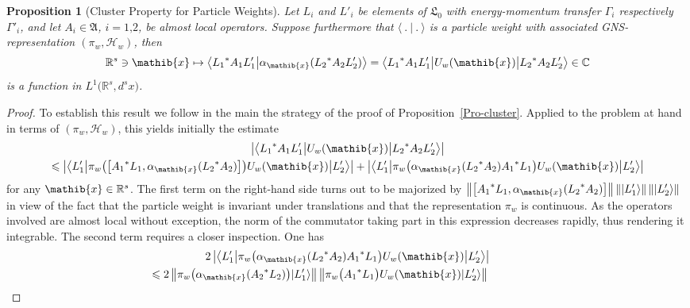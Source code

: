 \documentclass[11pt,twoside,openright]{report}
\theoremstyle{definition}
\theoremstyle{plain}
\newtheorem{Pro}[Def]{Proposition}
\theoremstyle{remark}
\theoremstyle{assumption}
\newcommand{\bcomm}[2]{\bigl[ #1 , #2 \bigr]}
\newcommand{\babs}[1]{\bigl\lvert #1 \bigr\rvert}
\newcommand{\norm}[1]{\lVert #1 \rVert}
\newcommand{\bnorm}[1]{\bigl\lVert #1 \bigr\rVert}
\newcommand{\ket}[1]{\vert #1 \rangle}
\newcommand{\scp}[2]{\langle #1 \vert #2 \rangle}
\newcommand{\bscp}[2]{\bigl\langle #1 \big\vert #2 \bigr\rangle}
\newcommand{\bscpx}[3]{\bigl\langle #1 \big\vert #2 \big\vert #3
  \bigr\rangle}
\newcommand{\Cbb}{\mathbb{C}}
\newcommand{\Afrak}{\mathfrak{A}}
\newcommand{\Lfrak}{\mathfrak{L}}
\newcommand{\xib}{\mathib{x}}
\newcommand{\Hscr}{\mathscr{H}}
\newcommand{\Rs}{\mathbb{R}^s}
\newcommand{\aibx}{\alpha_\mathib{x}}
\begin{document}
\begin{Pro}[Cluster Property for Particle Weights]
  \label{Pro-weights-cluster}
  Let $L_i$ and $L'_i$ be elements of $\Lfrak_0$ with energy-momentum
  transfer $\Gamma_i$ respectively $\Gamma'_i$, and let $A_i \in
  \Afrak$, $i = 1 \text{,} 2$, be almost local operators. Suppose
  furthermore that $\scp{~.~}{~.~}$ is a particle weight with
  associated GNS-representation $( \pi_w , \Hscr_w )$, then
  \begin{equation*}
    \Rs \ni \xib \mapsto \bscp{{L_1}^* A_1 L'_1}{\aibx ( {L_2}^* A_2
    L'_2 )} = \bscpx{{L_1}^* A_1 L'_1}{U_w ( \xib )}{{L_2}^* A_2 L'_2}
    \in \Cbb
  \end{equation*}
  is a function in $L^1 \bigl( \Rs , d^s x \bigr)$.
\end{Pro}
\begin{proof}
  To establish this result we follow in the main the strategy of the
  proof of Proposition~\ref{Pro-cluster}. Applied to the problem at
  hand in terms of $( \pi_w , \Hscr_w )$, this yields initially the
  estimate
  \begin{multline}
    \label{eq-weight-cluster-estimate1}
    \babs{\bscpx{{L_1}^* A_1 L'_1}{U_w ( \xib )}{{L_2}^* A_2 L'_2}} \\
    \leqslant \babs{\bscpx{L'_1}{\pi_w \bigl( \bcomm{{A_1}^*
    L_1}{\aibx ( {L_2}^* A_2 )} \bigr) U_w ( \xib )}{L'_2}} +
    \babs{\bscpx{L'_1}{\pi_w \bigl( \aibx ( {L_2}^* A_2 ) {A_1}^* L_1
    \bigr) U_w ( \xib )}{L'_2}}
  \end{multline}
  for any $\xib \in \Rs$. The first term on the right-hand side turns
  out to be majorized by $\bnorm{\bcomm{{A_1}^* L_1}{\aibx ( {L_2}^*
  A_2 )}} \, \norm{\ket{L'_1}} \, \norm{\ket{L'_2}}$ in view of the
  fact that the particle weight is invariant under translations and
  that the representation $\pi_w$ is continuous. As the operators
  involved are almost local without exception, the norm of the
  commutator taking part in this expression decreases rapidly, thus
  rendering it integrable. The second term requires a closer
  inspection. One has
  \begin{multline}
    \label{eq-weight-cluster-estimate2}
    2 \, \babs{\bscpx{L'_1}{\pi_w \bigl( \aibx ( {L_2}^* A_2 ) {A_1}^*
    L_1 \bigr) U_w ( \xib )}{L'_2}} \\
    \mspace{-90mu} \leqslant 2 \, \bnorm{\pi_w \bigl( \aibx (  {A_2}^*
    L_2 ) \bigr) \ket{L'_1}} \, \bnorm{\pi_w \bigl( {A_1}^* L_1 \bigr)
    U_w ( \xib ) \ket{L'_2}} \\

\end{multline}
\end{proof}
\end{document}
